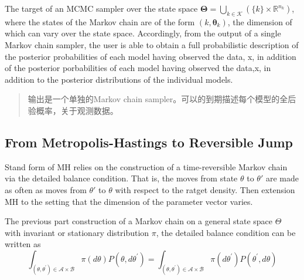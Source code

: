 \documentclass[
]{book}
\theoremstyle{definition}
\theoremstyle{definition}
\theoremstyle{definition}
\theoremstyle{remark}
\begin{document}
The target of an MCMC sampler over the state space \(\boldsymbol{\Theta}=\bigcup_{k \in \mathcal{K}}\left(\{k\} \times \mathbb{R}^{n_{k}}\right)\), where the states of the Markov chain are of the form \((k,\boldsymbol \theta_k)\), the dimension of which can vary over the state space. Accordingly, from the output of a single Markov chain sampler, the user is able to obtain a full probabilistic description of the posterior probabilities of each model having observed the data, x, in addition of the posterior porbabilities of each model having observed the data,x, in addition to the posterior distributions of the individual models.

\begin{quote}
输出是一个单独的Markov chain sampler。可以的到期描述每个模型的全后验概率，关于观测数据。
\end{quote}

\hypertarget{from-metropolis-hastings-to-reversible-jump}{%
\subsection{From Metropolis-Hastings to Reversible Jump}\label{from-metropolis-hastings-to-reversible-jump}}

Stand form of MH relies on the construction of a time-reversible Markov chain via the detailed balance condition. That is, the moves from state \(\theta\) to \(\theta'\) are made as often as moves from \(\theta'\) to \(\theta\) with respect to the ratget density. Then extension MH to the setting that the dimension of the parameter vector varies.

The previous part construction of a Markov chain on a general state space \(\Theta\) with invariant or stationary distribution \(\pi\), the detailed balance condition can be written as
\[
\int_{\left(\theta, \theta^{\prime}\right) \in \mathcal{A} \times \mathcal{B}} \pi(d \theta) P\left(\theta, d \theta^{\prime}\right)=\int_{\left(\theta, \theta^{\prime}\right) \in \mathcal{A} \times \mathcal{B}} \pi\left(d \theta^{\prime}\right) P\left(\theta^{\prime}, d \theta\right)
\]
\end{document}
